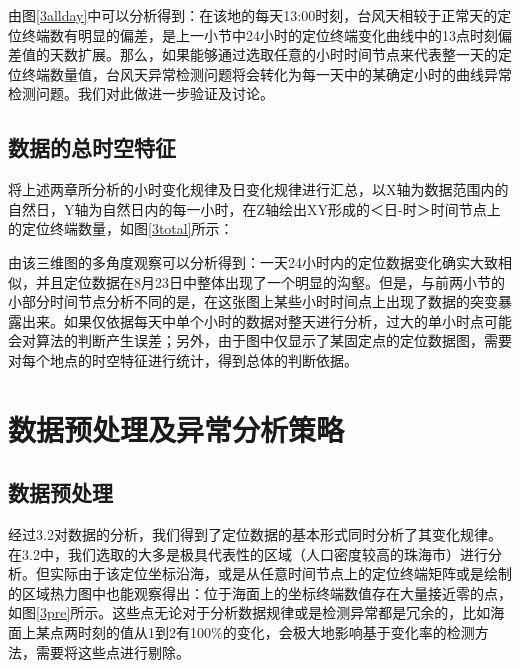 \documentclass[a4paper,AutoFakeBold,oneside,12pt]{book}
\begin{document}

	由图\ref{3allday}中可以分析得到：在该地的每天13:00时刻，台风天相较于正常天的定位终端数有明显的偏差，是上一小节中24小时的定位终端变化曲线中的13点时刻偏差值的天数扩展。那么，如果能够通过选取任意的小时时间节点来代表整一天的定位终端数量值，台风天异常检测问题将会转化为每一天中的某确定小时的曲线异常检测问题。我们对此做进一步验证及讨论。

\subsection{数据的总时空特征}
	将上述两章所分析的小时变化规律及日变化规律进行汇总，以X轴为数据范围内的自然日，Y轴为自然日内的每一小时，在Z轴绘出XY形成的＜日-时＞时间节点上的定位终端数量，如图\ref{3total}所示：


	由该三维图的多角度观察可以分析得到：一天24小时内的定位数据变化确实大致相似，并且定位数据在8月23日中整体出现了一个明显的沟壑。但是，与前两小节的小部分时间节点分析不同的是，在这张图上某些小时时间点上出现了数据的突变暴露出来。如果仅依据每天中单个小时的数据对整天进行分析，过大的单小时点可能会对算法的判断产生误差；另外，由于图中仅显示了某固定点的定位数据图，需要对每个地点的时空特征进行统计，得到总体的判断依据。

\section{数据预处理及异常分析策略}

\subsection{数据预处理}
	经过3.2对数据的分析，我们得到了定位数据的基本形式同时分析了其变化规律。在3.2中，我们选取的大多是极具代表性的区域（人口密度较高的珠海市）进行分析。但实际由于该定位坐标沿海，或是从任意时间节点上的定位终端矩阵或是绘制的区域热力图中也能观察得出：位于海面上的坐标终端数值存在大量接近零的点，如图\ref{3pre}所示。这些点无论对于分析数据规律或是检测异常都是冗余的，比如海面上某点两时刻的值从1到2有100\%的变化，会极大地影响基于变化率的检测方法，需要将这些点进行剔除。

\end{document}
